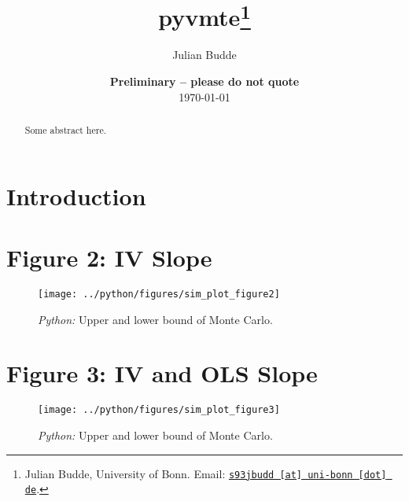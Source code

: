 \documentclass[11pt, a4paper, leqno]{article}
\begin{document}
\title{pyvmte\thanks{Julian Budde, University of Bonn. Email: \href{mailto:s93jbudd@uni-bonn.de}{\nolinkurl{s93jbudd [at] uni-bonn [dot] de}}.}}

\author{Julian Budde}

\date{
    {\bf Preliminary -- please do not quote}
    \\[1ex]
    \today
}

\maketitle


\begin{abstract}
    Some abstract here.
\end{abstract}

\clearpage


\section{Introduction} %

\section{Figure 2: IV Slope}

\begin{figure}[H]

    \centering
    \texttt{[image: ../python/figures/sim\_plot\_figure2]}

    \caption{\emph{Python:} Upper and lower bound of Monte Carlo.}
    \label{fig:bounds_fig2}

\end{figure}

\begin{table}[!h]
    
    \caption{\label{tab:fig2}}
\end{table}

\clearpage
\newpage

\section{Figure 3: IV and OLS Slope}
\begin{figure}[H]

    \centering
    \texttt{[image: ../python/figures/sim\_plot\_figure3]}

    \caption{\emph{Python:} Upper and lower bound of Monte Carlo.}
    \label{fig:bounds_fig3}

\end{figure}
\end{document}
